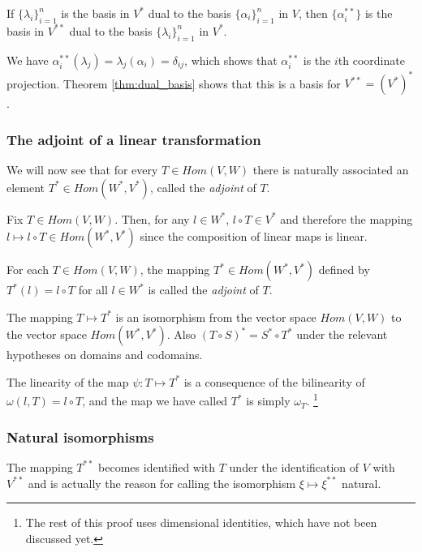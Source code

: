 \documentclass[12pt,letterpaper,reqno]{article}
\numberwithin{equation}{section}
\newcommand{\ti}[1]{\textit{#1}}
\newcommand{\fixme}[1]{{\color{orange}{[#1]}}}
\begin{document}
\begin{thm}
	If $\{\lambda_i\}_{i=1}^n$ is the basis in $V^*$ dual to the basis $\{\alpha_i\}_{i=1}^n$ in $V$, then $\{\alpha_i^{**}\}$ is the basis in $V^{**}$ dual to the basis $\{\lambda_i\}_{i=1}^n$ in $V^*$.
\end{thm}

\begin{pf}
We have $\alpha_i^{**}(\lambda_j)=\lambda_j(\alpha_i)=\delta_{ij}$, which shows that $\alpha_i^{**}$ is the $i$th coordinate projection. Theorem \ref{thm:dual_basis} shows that this is a basis for $V^{**}=(V^*)^*$.
\end{pf}

\subsubsection{The adjoint of a linear transformation}
We will now see that for every $T \in Hom(V,W)$ there is naturally associated an element  $T^* \in Hom(W^*,V^*)$, called the \ti{adjoint} of $T$.

Fix $T \in Hom(V,W)$. Then, for any $l \in W^*$, $l \circ T \in V^*$ and therefore the mapping $l \mapsto l \circ T \in Hom(W^*,V^*)$ since the composition of linear maps is linear.
\begin{defn}[Adjoint of $T$]
	For each $T \in Hom(V,W)$, the mapping $T^* \in Hom(W^*,V^*)$ defined by $T^*(l)=l \circ T$ for all $l \in W^*$ is called the \ti{adjoint} of $T$.
\end{defn}

\begin{thm}
	The mapping $T \mapsto T^*$ is an isomorphism from the vector space $Hom(V,W)$ to the vector space $Hom(W^*,V^*)$. Also $(T \circ S)^*=S^* \circ T^*$ under the relevant hypotheses on domains and codomains.
\end{thm}

\begin{pf}
The linearity of the map $\psi:T \mapsto T^*$ is a consequence of the bilinearity of $\omega(l,T)=l \circ T$, and the map we have called $T^*$ is simply $\omega_T$. \footnote{The rest of this proof uses dimensional identities, which have not been discussed yet.}	
\end{pf}

\fixme{Add exercise.}

\subsubsection{Natural isomorphisms}
\fixme{This surely should go somewhere else.}
The mapping $T^{**}$ becomes identified with $T$ under the identification of $V$ with $V^{**}$ and is actually the reason for calling the isomorphism $\xi \mapsto \xi^{**}$ natural.
\end{document}
